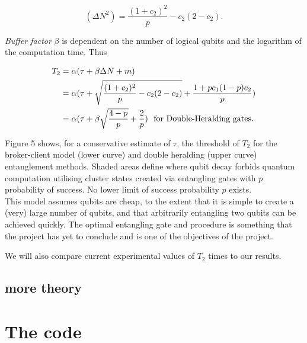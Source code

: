\documentclass{article}
\numberwithin{equation}{section} %
\begin{document}
\begin{equation}
(\Delta N^2)=\frac{(1+c_2)^2}{p}-c_2(2-c_2). %
\end{equation}

\emph{Buffer factor} $\beta$ is dependent on the number of logical qubits and the logarithm of the computation time. Thus

\begin{align}
T_2&=\alpha(\tau+\beta\Delta N+m) \notag \\
&=\alpha(\tau+\sqrt{\frac{(1+c_2)^2}{p}-c_2(2-c_2)}+\frac{1+pc_1(1-p)c_2}{p}) \notag \\
&=\alpha(\tau+\beta\sqrt{\frac{4-p}{p}}+\frac{2}{p}) \text{ } \text{ for Double-Heralding gates.} 
\end{align}

           
  Figure 5 shows, for a conservative estimate of $\tau$, the threshold of $T_2$ for the broker-client model (lower curve) and double heralding (upper curve) entanglement methods. Shaded areas define where qubit decay forbids quantum computation utilising cluster states created via entangling gates with $p$ probability of success. No lower limit of success probability $p$ exists.\\


This model assumes qubits are cheap, to the extent that it is simple to create a (very) large number of qubits, and that arbitrarily entangling two qubits can be achieved quickly. The optimal entangling gate and procedure is something that the project has yet to conclude and is one of the objectives of the project. 

We will also compare current experimental values of $T_2$ times to our results.

\subsection{more theory}



\section{The code}     
\end{document}
